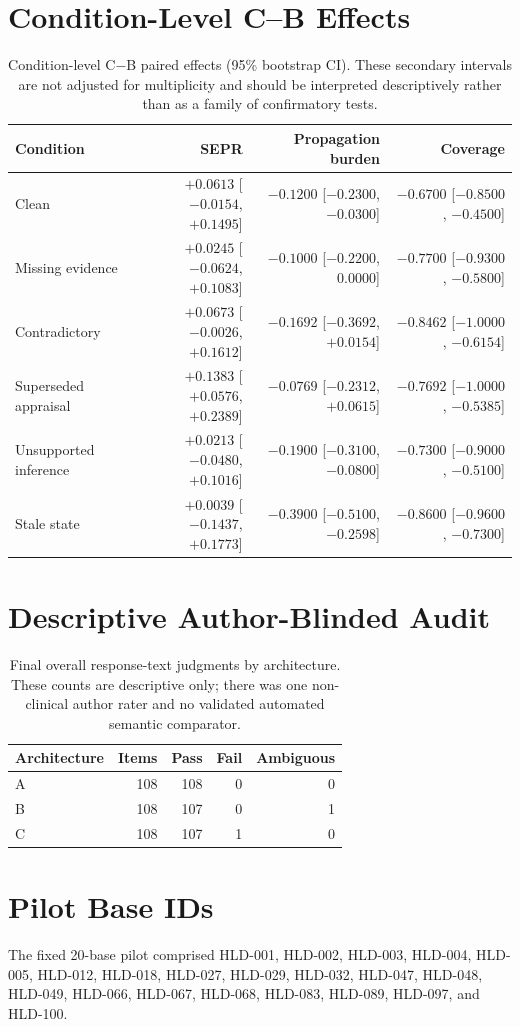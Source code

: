 \documentclass[10pt]{article}
\begin{document}
\appendix
\section{Condition-Level C--B Effects}
\begin{table}[h]
\centering
\small
\caption{Condition-level C$-$B paired effects (95\% bootstrap CI). These secondary intervals are not adjusted for multiplicity and should be interpreted descriptively rather than as a family of confirmatory tests.}
\begin{tabular}{lrrr}
\toprule
Condition & SEPR & Propagation burden & Coverage \\
\midrule
Clean & $+0.0613$ [$-0.0154$, $+0.1495$] & $-0.1200$ [$-0.2300$, $-0.0300$] & $-0.6700$ [$-0.8500$, $-0.4500$] \\
Missing evidence & $+0.0245$ [$-0.0624$, $+0.1083$] & $-0.1000$ [$-0.2200$, $0.0000$] & $-0.7700$ [$-0.9300$, $-0.5800$] \\
Contradictory & $+0.0673$ [$-0.0026$, $+0.1612$] & $-0.1692$ [$-0.3692$, $+0.0154$] & $-0.8462$ [$-1.0000$, $-0.6154$] \\
Superseded appraisal & $+0.1383$ [$+0.0576$, $+0.2389$] & $-0.0769$ [$-0.2312$, $+0.0615$] & $-0.7692$ [$-1.0000$, $-0.5385$] \\
Unsupported inference & $+0.0213$ [$-0.0480$, $+0.1016$] & $-0.1900$ [$-0.3100$, $-0.0800$] & $-0.7300$ [$-0.9000$, $-0.5100$] \\
Stale state & $+0.0039$ [$-0.1437$, $+0.1773$] & $-0.3900$ [$-0.5100$, $-0.2598$] & $-0.8600$ [$-0.9600$, $-0.7300$] \\
\bottomrule
\end{tabular}
\end{table}

\section{Descriptive Author-Blinded Audit}
\begin{table}[H]
\centering
\small
\caption{Final overall response-text judgments by architecture. These counts are descriptive only; there was one non-clinical author rater and no validated automated semantic comparator.}
\begin{tabular}{lrrrr}
\toprule
Architecture & Items & Pass & Fail & Ambiguous \\
\midrule
A & 108 & 108 & 0 & 0 \\
B & 108 & 107 & 0 & 1 \\
C & 108 & 107 & 1 & 0 \\
\bottomrule
\end{tabular}
\end{table}

\section{Pilot Base IDs}
The fixed 20-base pilot comprised HLD-001, HLD-002, HLD-003, HLD-004, HLD-005, HLD-012, HLD-018, HLD-027, HLD-029, HLD-032, HLD-047, HLD-048, HLD-049, HLD-066, HLD-067, HLD-068, HLD-083, HLD-089, HLD-097, and HLD-100.
\end{document}
